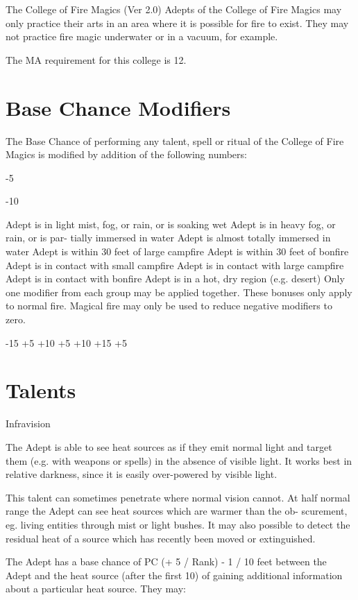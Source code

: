 \begin{Chapter}{The College of Fire Magics (Ver 2.0)}
Adepts of the College of Fire Magics may only practice their arts in
an area where it is possible for fire to exist.  They may not practice
fire magic underwater or in a vacuum, for example.

The MA requirement for this college is 12. 

\section{Base Chance Modifiers}

The Base Chance of performing any talent, spell or ritual of the
College of Fire Magics is modified by addition of the following
numbers:

-5 

-10 

Adept is in light mist, fog, or rain, or is 
soaking wet 
Adept is in heavy fog, or rain, or is par-
tially immersed in water 
Adept is almost totally immersed in water 
Adept is within 30 feet of large campfire 
Adept is within 30 feet of bonfire 
Adept is in contact with small campfire 
Adept is in contact with large campfire 
Adept is in contact with bonfire 
Adept is in a hot, dry region (e.g. desert) 
Only one modifier from each group may be applied 
together. These bonuses only apply to normal fire. 
Magical  fire  may  only  be  used  to  reduce  negative 
modifiers to zero. 

-15 
+5 
+10 
+5 
+10 
+15 
+5 

\section{Talents}

\begin{talent}[T-1]{Infravision}

\begin{effects}
The Adept is able to see heat sources as if they emit normal light and
target them (e.g.  with weapons or spells) in the absence of visible
light. It works best in relative darkness, since it is easily
over-powered by visible light.

This talent can sometimes penetrate where normal vision cannot. At
half normal range the Adept can see heat sources which are warmer than
the ob- scurement, eg.  living entities through mist or light bushes.
It may also possible to detect the residual heat of a source which has
recently been moved or extinguished.

The Adept has a base chance of PC (+ 5 / Rank) - 1 / 10 feet between
the Adept and the heat source (after the first 10) of gaining
additional information about a particular heat source. They may:


\end{effects}
\end{talent}
\end{Chapter}
